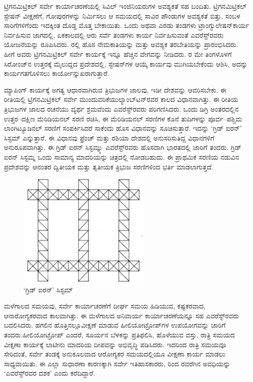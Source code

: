 ಟ್ರಿಗನಮಿಟ್ರಿಕಲ್​ ಸರ್ವೇ ಕಾರ್ಯಾಚರಣೆಯಲ್ಲಿ ಸಿವಿಲ್​ ಇಂಜಿನಿಯರುಗಳ ಅವಶ್ಯಕತೆ ಸಹ ಬಂದಿತು. ಟ್ರಿಗನಮಿಟ್ರಿಕಲ್​ ಸ್ಟೇಷನ್​ ವೀಕ್ಷಣೆಗೆ, ಗೋಪುರಗಳನ್ನು ನಿರ್ಮಿಸಲು ಆ ಸಮಯದಲ್ಲಿ  ಸಾವಿರ ಪೌಂಡುಗಳ ಅವಶ್ಯಕತೆ ಬಿತ್ತು. ಸಂಬಳ ಸಾರಿಗೆಗಳಿಗೆಂದು ಇದಕ್ಕಿಂತ ದೊಡ್ಡ ಮೊತ್ತ ಬೇಕಾಯಿತು. ಒಂದು ಅಥವಾ ಎರಡು ತಂಡಗಳು ಟ್ರಾಂಗ್ಯುಲೇಷನ್​ ಕಾರ್ಯ ನಿರ್ವಹಿಸುವ ಜಾಗದಲ್ಲಿ, ಏಕಕಾಲದಲ್ಲಿ ಆರು ಸರ್ವೆ ತಂಡಗಳು ಕಾರ್ಯ ನಿರ್ವಹಿಸುವಂತೆ ಎವರೆಸ್ಟ್​ರವರು ಯೋಜನೆಯನ್ನು ರೂಪಿಸಿದರು. ರಲ್ಲಿ ಹೊಸ ನೇಮಕಾತಿಯನ್ನು ಮತ್ತು ಅವಶ್ಯಕ ತರಬೇತಿಯನ್ನು ಪ್ರಾರಂಭಿಸಿದರು. ಹೀಗೆ ಅವರು ಟ್ರಿಗನಮಿಟ್ರಿಕಲ್​ ಸರ್ವೇ ಕಾರ್ಯಕ್ಕೆ ಇನ್ನೂ ಹೆಚ್ಚಿನ ವೇಗವನ್ನು ನೀಡಿದರು. ರ ಮೇ ತಿಂಗಳೊಳಗೆ ಸಿರೋಂಜ್​ನ ಉತ್ತರಕ್ಕೆ  ಮೈಲುದ್ದದ ಪ್ರದೇಶದಲ್ಲಿ, ಸ್ಟೇಷನ್​ಗಳ ಆಯ್ಕೆ ಕಾರ್ಯವು ಮುಗಿಯಬೇಕೆಂದು ಆಶಿಸಿ, ಅದನ್ನು ಕಾರ್ಯಗತಗೊಳಿಸಲು ಕಾರ್ಯೋನ್ನುಖರಾಗುತ್ತಾರೆ.

ಮ್ಯಾಪಿಂಗ್​ ಕಾರ್ಯಕ್ಕೆ ಅಗತ್ಯ ಆಧಾರವಾಗಿರುವ ತ್ರಿಭುಜಗಳ ಜಾಲವು, ಇಡೀ ದೇಶವನ್ನು ಆವರಿಸಬೇಕು. ಈ ರೀತಿಯಲ್ಲಿ ಟ್ರಿಗನಮಿಟ್ರಿಕಲ್​ ಸರ್ವೇ ಮುಂದುವರಿಕೆಯು\break ಲ್ಯಾಂಬ್​ಟನ್​ರವರ ಕಾಲದ ವಿಧಾನವಾಗಿತ್ತು. ಈ ರೀತಿಯ ತ್ರಿಭುಜಗಳ ಜಾಲದ ರಚನೆಯು ವ್ಯರ್ಥ ಶ್ರಮವೆಂದು ಎವರೆಸ್ಟ್​ರವರು ಪರಿಗಣಿಸಿದರು. ಒಂದು ಡಿಗ್ರಿ ಅಂತರದಲ್ಲಿನ ಉತ್ತರ–ದಕ್ಷಿಣ ಮೆರಿಡಿಯನಲ್​ ಸರಣಿ ರಚಿಸಿ, ಈ ಮೆರಿಡಿಯನಲ್​ ಸರಣಿಗಳ ಕೊನೆ ತುದಿಗಳನ್ನು ಪೂರ್ವ–ಪಶ್ಚಿಮ ಲಾಂಗಿಟ್ಯೂಡಿನಲ್​ ಸರಣಿಗೆ ಸಂಪರ್ಕಿಸಿದರೆ ಸಾಕೆಂದು ಹೊಸ ವಿಧಾನವನ್ನು ಸೂಚಿಸುತ್ತಾರೆ. ಇದನ್ನು ‘ಗ್ರಿಡ್​ ಐರನ್​’ ಸಿಸ್ಟಮ್ ಎನ್ನುತ್ತಾರೆ. ಈ ವಿಧಾನವು ಫ್ರೆಂಚ್​ ಮತ್ತು ರಶಿಯಾ ದೇಶದಲ್ಲಿ ಅನುಸರಿಸುತಿದ್ದ ವಿಧಾನಗಳಿಗೆ ಅನುರೂಪವಾಗಿತ್ತು. ಈ ಗ್ರಿಡ್​ ಐರನ್​ ಸಿಸ್ಟಮ್ನ್ನು ಎವರೆಸ್ಟ್​ರವರು ಹೊಸದಾಗಿ ಭಾರತದಲ್ಲಿ ಜಾರಿಗೆ ತಂದರು. ಗ್ರಿಡ್​ ಐರನ್​ ಸಿಸ್ಟಮ್ನ ಒಂದು ಸಾಮಾನ್ಯ ಮಾದರಿಯನ್ನು ಚಿತ್ರದಲ್ಲಿ ನೋಡಬಹುದು. ಈ ಪ್ರಾಥಮಿಕ ಸರಣಿಯ ನಡುವಿನ ಪ್ರದೇಶವನ್ನು ಆನಂತರ ದ್ವಿತೀಯಕ ಮತ್ತು ತೃತೀಯಕ ತ್ರಿಭುಜ ಸರಣಿಗಳಿಂದ ಭರ್ತಿ ಮಾಡಲಾಗುತ್ತದೆ.

\begin{figure}
\includegraphics[scale=0.6]{"images/image013.jpg"}
\caption{‘ಗ್ರಿಡ್​ ಐರನ್​’ ಸಿಸ್ಟಮ್}\label{chap11-fig1}
\end{figure}

ಮಳೆಗಾಲದ ಸಮಯವು, ಸರ್ವೇ ಕಾರ್ಯಾಚರಣೆಗೆ ದೀರ್ಘ ಸಮಯ ಹಿಡಿಯುವ, ಕಷ್ಟಕರವಾದ, ಆನಾರೋಗ್ಯಕರವಾದ ಕಾಲವಾಗಿತ್ತು. ಈ ಮಳೆಗಾಲದ ಅನಿವಾರ್ಯ ಕಾರ್ಯಾಚರಣೆಯನ್ನೂ ಸಹ ಎವರೆಸ್ಟ್​ರವರು ಬದಲಿಸಿದರು. ಹಗಲಿನ ಹೊತ್ತಿನಲ್ಲೂ\break ವೀಕ್ಷಣೆ ಮಾಡುವ ಹೀಲಿಯೋಟ್ರೋಪ್​ಗಳ ಉಪಯೋಗವನ್ನು ಜಾರಿಗೆ ತಂದರು.\break ಹೀಲಿಯೋಟ್ರೋಪ್​ ಎಂದರೆ, ಸೂರ್ಯನ ಬೆಳಕನ್ನು ಪ್ರತಿಫಲಿಸಿ, ಹೊಳೆಯುವ ವಸ್ತು. ರಾತ್ರಿ ಸಮಯದ ವೀಕ್ಷಣಾ ಕಾರ್ಯಕ್ಕೆ ಲಾಟೀನು ಮಾದರಿಯ ದೀಪವನ್ನು ಅಭಿವೃದ್ಧಿ ಪಡಿಸಿದರು. ಇದರಿಂದ ರಾತ್ರಿ ಸಮಯವೂ ಸೇರಿದಂತೆ, ಸರ್ವೇ ತಂಡಕ್ಕೆ ಅನುಕೂಲವಾದ ಆರೋಗ್ಯಕರ ಸಮಯದಲ್ಲಿಯೂ ವೀಕ್ಷಣಾ ಕಾರ್ಯ ಮಾಡಲು ಸಾಧ್ಯವಾಯಿತು. ಈ ಎಲ್ಲಾ ಸುಧಾರಣಾ ಕಾರಣಕ್ಕಾಗಿ ಸರ್ವೇ ಇತಿಹಾಸಕಾರರು,  ರಿಂದ  ರವರೆಗಿನ ಅವಧಿಯನ್ನು ‘ಎವರೆಸ್ಟ್​ರವರ ದಶಕ’ ಎಂದು ಕರೆದಿದ್ದಾರೆ.

